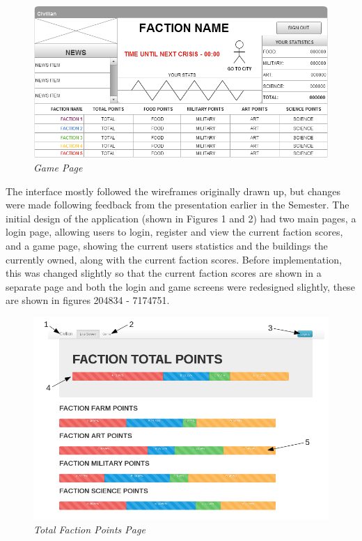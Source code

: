 \documentclass{sig-alt-release2}
\begin{document}
\begin{figure}[!htbp]
  \caption{\textit{Game Page}}
  \begin{center}
		\includegraphics[scale=0.25]{img/w4.png}
  \end{center}
\end{figure}

The interface mostly followed the wireframes originally drawn up, but changes were made following feedback from the presentation earlier in the Semester. The initial design of the application (shown in Figures 1 and 2) had two main pages, a login page, allowing users to login, register and view the current faction scores, and a game page, showing the current users statistics and the buildings the currently owned, along with the current faction scores. Before implementation, this was changed slightly so that the current faction scores are shown in a separate page and both the login and game screens were redesigned slightly, these are shown in figures 204834 - 7174751.\\

\begin{figure}[!htbp]
  \caption{\textit{Total Faction Points Page}}
  \begin{center}
		\includegraphics[scale=0.30]{img/factionlabel.png}
  \end{center}
\end{figure}
\end{document}
